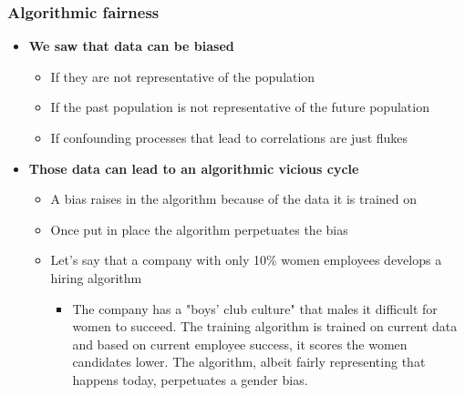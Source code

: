 \documentclass{beamer}
\begin{document}
\begin{frame}\frametitle{Algorithmic fairness}
\begin{itemize}
	\setlength\itemsep{1em}
	\item {\bf We saw that data can be biased}
	\begin{itemize}
		\item If they are not representative of the population
		\item If the past population is not representative of the future population
		\item If confounding processes that lead to correlations are just flukes
	\end{itemize}
	\item {\bf Those data can lead to an algorithmic vicious cycle}
	\begin{itemize}
		\item A bias raises in the algorithm because of the data it is trained on
		\item Once put in place the algorithm perpetuates the bias
		\item Let's say that a company with only 10\% women employees develops a hiring algorithm
		\begin{itemize}
			\item[] The company has a "boys' club culture" that males it difficult for women to succeed. The training algorithm is trained on current data and based on current employee success, it scores the women candidates lower. The algorithm, albeit fairly representing that happens today, perpetuates a gender bias.
		\end{itemize}
	\end{itemize}
\end{itemize}
\end{frame}
\end{document}

